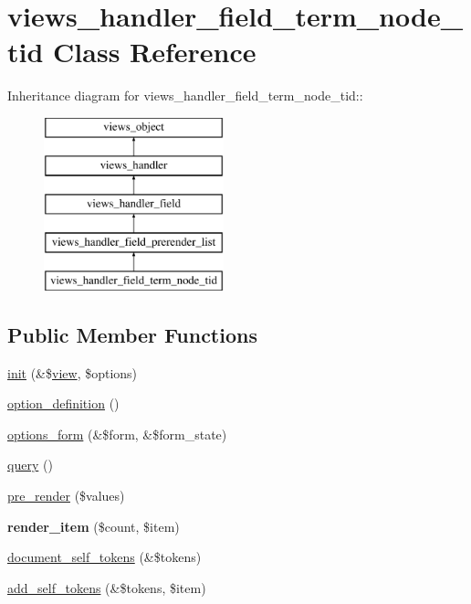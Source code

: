 \hypertarget{classviews__handler__field__term__node__tid}{
\section{views\_\-handler\_\-field\_\-term\_\-node\_\-tid Class Reference}
\label{classviews__handler__field__term__node__tid}
}
Inheritance diagram for views\_\-handler\_\-field\_\-term\_\-node\_\-tid::\begin{figure}[H]
\begin{center}
\leavevmode
\includegraphics[height=5cm]{classviews__handler__field__term__node__tid}
\end{center}
\end{figure}
\subsection*{Public Member Functions}
\begin{CompactItemize}
\item 
\hyperlink{classviews__handler__field__term__node__tid_639e45d86c954e90120193b84c8b910b}{init} (\&\$\hyperlink{classview}{view}, \$options)
\item 
\hyperlink{classviews__handler__field__term__node__tid_6c6e6369b1897f4f6643a609b1a802a5}{option\_\-definition} ()
\item 
\hyperlink{classviews__handler__field__term__node__tid_0f0641c036e0a2498abd497cba1161a5}{options\_\-form} (\&\$form, \&\$form\_\-state)
\item 
\hyperlink{classviews__handler__field__term__node__tid_8160a16d41604b141768dc313b6223b9}{query} ()
\item 
\hyperlink{classviews__handler__field__term__node__tid_f3446d6e75ff34c2b165a5513a385c3b}{pre\_\-render} (\$values)
\item 
\hypertarget{classviews__handler__field__term__node__tid_f5d54ae4ba053a0a5cccafc979f14b31}{
\textbf{render\_\-item} (\$count, \$item)}
\label{classviews__handler__field__term__node__tid_f5d54ae4ba053a0a5cccafc979f14b31}

\item 
\hyperlink{classviews__handler__field__term__node__tid_fa909e51eb90573d468deb29a3943d94}{document\_\-self\_\-tokens} (\&\$tokens)
\item 
\hyperlink{classviews__handler__field__term__node__tid_7fea3443ab075e3e35212ddc3b0d95f3}{add\_\-self\_\-tokens} (\&\$tokens, \$item)
\end{CompactItemize}


